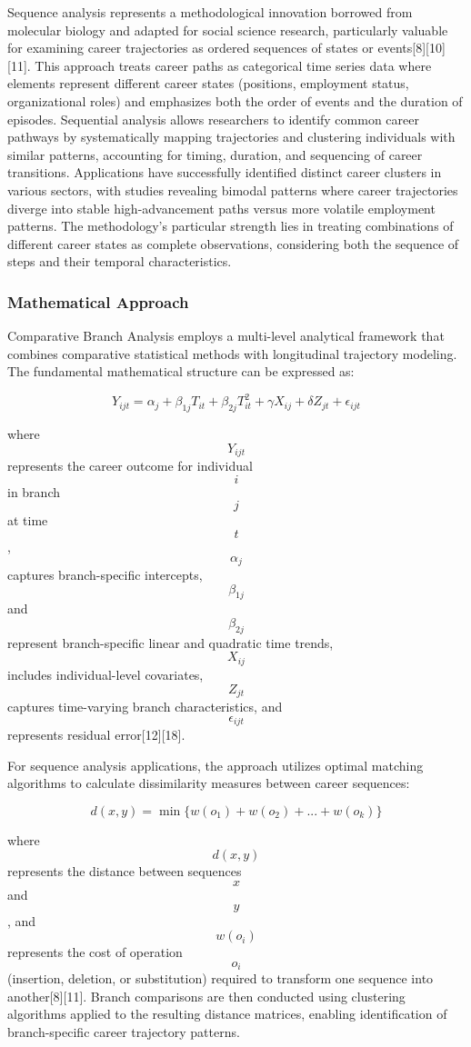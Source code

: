 \documentclass[main.tex]{subfiles}
\begin{document}
Sequence analysis represents a methodological innovation borrowed from molecular biology and adapted for social science research, particularly valuable for examining career trajectories as ordered sequences of states or events[8][10][11]. This approach treats career paths as categorical time series data where elements represent different career states (positions, employment status, organizational roles) and emphasizes both the order of events and the duration of episodes. Sequential analysis allows researchers to identify common career pathways by systematically mapping trajectories and clustering individuals with similar patterns, accounting for timing, duration, and sequencing of career transitions. Applications have successfully identified distinct career clusters in various sectors, with studies revealing bimodal patterns where career trajectories diverge into stable high-advancement paths versus more volatile employment patterns. The methodology's particular strength lies in treating combinations of different career states as complete observations, considering both the sequence of steps and their temporal characteristics.

\subsubsection{Mathematical Approach}

Comparative Branch Analysis employs a multi-level analytical framework that combines comparative statistical methods with longitudinal trajectory modeling. The fundamental mathematical structure can be expressed as:

$$Y_{ijt} = \alpha_j + \beta_{1j}T_{it} + \beta_{2j}T_{it}^2 + \gamma X_{ij} + \delta Z_{jt} + \epsilon_{ijt}$$

where $$Y_{ijt}$$ represents the career outcome for individual $$i$$ in branch $$j$$ at time $$t$$, $$\alpha_j$$ captures branch-specific intercepts, $$\beta_{1j}$$ and $$\beta_{2j}$$ represent branch-specific linear and quadratic time trends, $$X_{ij}$$ includes individual-level covariates, $$Z_{jt}$$ captures time-varying branch characteristics, and $$\epsilon_{ijt}$$ represents residual error[12][18].

For sequence analysis applications, the approach utilizes optimal matching algorithms to calculate dissimilarity measures between career sequences:

$$d(x,y) = \min\{w(o_1) + w(o_2) + ... + w(o_k)\}$$

where $$d(x,y)$$ represents the distance between sequences $$x$$ and $$y$$, and $$w(o_i)$$ represents the cost of operation $$o_i$$ (insertion, deletion, or substitution) required to transform one sequence into another[8][11]. Branch comparisons are then conducted using clustering algorithms applied to the resulting distance matrices, enabling identification of branch-specific career trajectory patterns.
\end{document}
